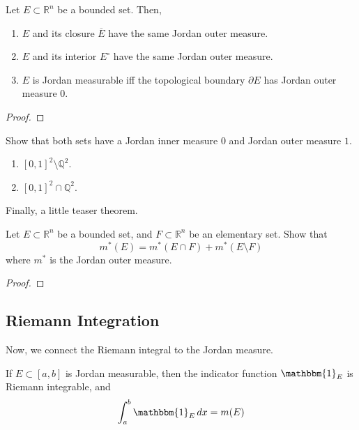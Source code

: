   \begin{theorem}
    Let $E \subset \mathbb{R}^n$ be a bounded set. Then, 
    \begin{enumerate}
      \item $E$ and its closure $\overline{E}$ have the same Jordan outer measure. 
      \item $E$ and its interior $E^\circ$ have the same Jordan outer measure. 
      \item $E$ is Jordan measurable iff the topological boundary $\partial E$ has Jordan outer measure $0$. 
    \end{enumerate}
  \end{theorem}
  \begin{proof}
    
  \end{proof}

  \begin{example}
    Show that both sets have a Jordan inner measure $0$ and Jordan outer measure $1$. 
    \begin{enumerate}
      \item $[0, 1]^2 \setminus \mathbb{Q}^2$. 
      \item $[0, 1]^2 \cap \mathbb{Q}^2$. 
    \end{enumerate}
  \end{example}

  Finally, a little teaser theorem. 

  \begin{theorem}
    Let $E \subset \mathbb{R}^n$ be a bounded set, and $F \subset \mathbb{R}^n$ be an elementary set. Show that 
    \begin{equation}
      m^\ast (E) = m^\ast (E \cap F) + m^\ast(E \setminus F)
    \end{equation}
    where $m^\ast$ is the Jordan outer measure. 
  \end{theorem}
  \begin{proof}
    
  \end{proof}

\subsection{Riemann Integration} 

  Now, we connect the Riemann integral to the Jordan measure. 

  \begin{theorem}
    If $E \subset [a, b]$ is Jordan measurable, then the indicator function $\mathbbm{1}_E$ is Riemann integrable, and 
    \begin{equation}
      \int_a^b \mathbbm{1}_{E} \,dx = m(E)
    \end{equation}
  \end{theorem}


